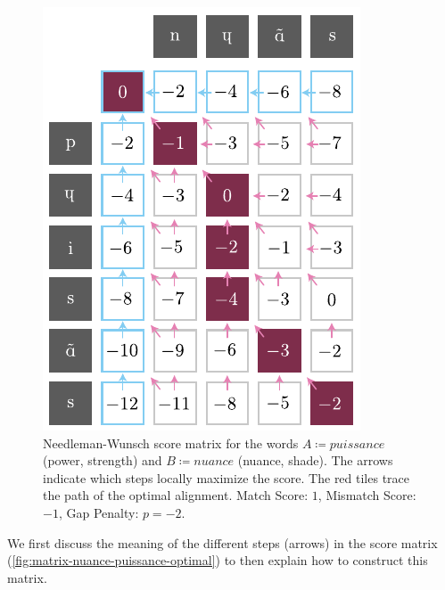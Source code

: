\begin{figure}[H]
    \centering
    \includegraphics[width=0.77\linewidth]{assets/illustrator/matrix-nuance-puissance-optimal.pdf}
    \caption{Needleman-Wunsch score matrix for the words $A\coloneqq\textit{puissance}$  (power, strength) and $B\coloneqq\textit{nuance}$  (nuance, shade). The arrows indicate which steps locally maximize the score. The red tiles trace the path of the optimal alignment. Match Score: $1$, Mismatch Score: $-1$, Gap Penalty: $p=-2$.}
    \label{fig:matrix-nuance-puissance-optimal}
\end{figure}

\vfill\null

We first discuss the meaning of the different steps (arrows) in the score matrix (\autoref{fig:matrix-nuance-puissance-optimal}) to then explain how to construct this matrix.

